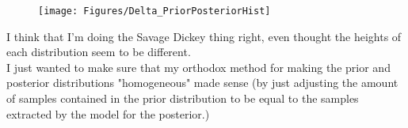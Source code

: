 \documentclass[a4paper ]{article}
\begin{document}
\begin{figure}[h]
\centering
\texttt{[image: Figures/Delta\_PriorPosteriorHist]}
\end{figure}
\clearpage


I think that I'm doing the Savage Dickey thing right, even thought the heights of each distribution seem to be different.\\

I just wanted to make sure that my orthodox method for making the prior and posterior distributions "homogeneous" made sense (by just adjusting the amount of samples contained in the prior distribution to be equal to the samples extracted by the model for the posterior.)
 
\end{document}
